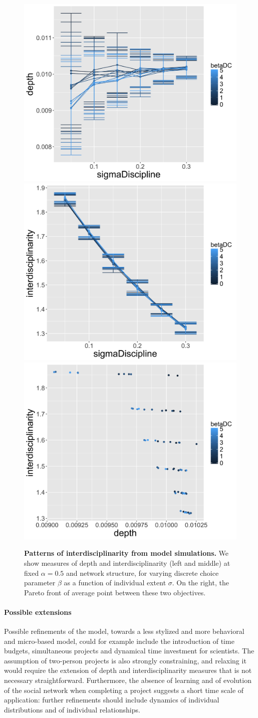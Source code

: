 \begin{figure}
	\centering
	\includegraphics[width=0.32\linewidth]{figures/depth-sigma_alpha0-5_rho0}
	\includegraphics[width=0.32\linewidth]{figures/interdisc-sigma_alpha0-5_rho0}
	\includegraphics[width=0.32\linewidth]{figures/pareto_alpha0-5_rho0}
	\caption{\textbf{Patterns of interdisciplinarity from model simulations.} We show measures of depth and interdisciplinarity (left and middle) at fixed $\alpha=0.5$ and network structure, for varying discrete choice parameter $\beta$ as a function of individual extent $\sigma$. On the right, the Pareto front of average point between these two objectives.}
	\label{fig:plots}
\end{figure}





\paragraph{Possible extensions}

Possible refinements of the model, towards a less stylized and more behavioral and micro-based model, could for example include the introduction of time budgets, simultaneous projects and dynamical time investment for scientists. The assumption of two-person projects is also strongly constraining, and relaxing it would require the extension of depth and interdisciplinarity measures that is not necessary straightforward. Furthermore, the absence of learning and of evolution of the social network when completing a project suggests a short time scale of application: further refinements should include dynamics of individual distributions and of individual relationships.


